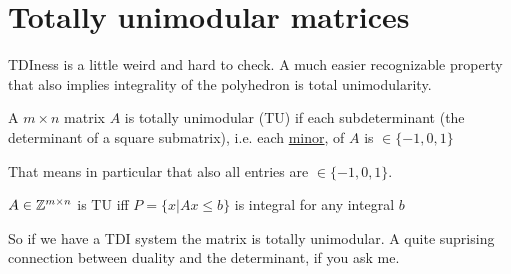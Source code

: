 \section{Totally unimodular matrices}

TDIness is a little weird and hard to check. A much easier recognizable property that also implies integrality of the polyhedron is total unimodularity.

\begin{Def} A $m\times n$ matrix $A$ is totally unimodular (TU) if each subdeterminant (the determinant of a square submatrix), i.e. each \href{http://en.wikipedia.org/wiki/Minor\_\%28linear\_algebra\%29}{minor}, of $A$ is $\in \{-1,0,1\}$
\end{Def}

That means in particular that also all entries are $\in \{-1,0,1\}$.

\begin{thm} $A\in \mathbb{Z}^{m\times n}$ is TU iff $P=\{x|Ax\leq b\}$ is integral for any integral $b$
\end{thm}

So if we have a TDI system the matrix is totally unimodular. A quite suprising connection between duality and the determinant, if you ask me.

